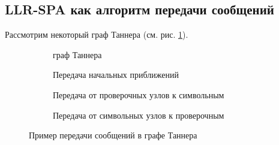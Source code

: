 \subsection{LLR-SPA как алгоритм передачи сообщений}

Рассмотрим некоторый граф Таннера (см. рис. \ref{dec1}).

\begin{figure}[h!]
\centering
\begin{subfigure}{.5\textwidth}
  \centering
  \caption{граф Таннера}
  \label{dec1}
\end{subfigure}%
\begin{subfigure}{.5\textwidth}
  \centering
  \caption{Передача начальных приближений}
  \label{dec2}
\end{subfigure}

\begin{subfigure}{.5\textwidth}
  \centering
  \caption{Передача от проверочных узлов к символьным}
  \label{dec3}
\end{subfigure}%
\begin{subfigure}{.5\textwidth}
  \centering
  \caption{Передача от символьных узлов к проверочным}
  \label{dec4}
\end{subfigure}
\caption{Пример передачи сообщений в графе Таннера}
\end{figure}

